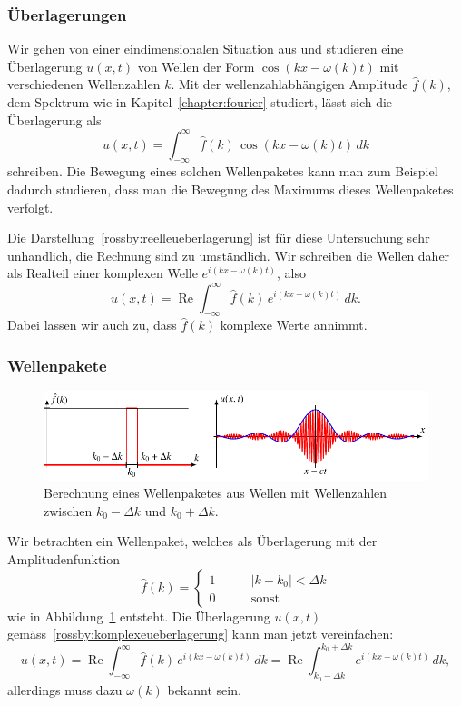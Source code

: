 \subsubsection{Überlagerungen}
Wir gehen von einer eindimensionalen Situation aus und studieren
eine Überlagerung $u(x,t)$ von Wellen der Form $\cos(kx-\omega(k) t)$
mit verschiedenen Wellenzahlen $k$.
Mit der wellenzahlabhängigen Amplitude $\hat f(k)$, dem Spektrum
wie in Kapitel~\ref{chapter:fourier} studiert, lässt sich die
Überlagerung als
\begin{equation}
u(x,t)
=
\int_{-\infty}^\infty \hat f(k)\,\cos(kx-\omega(k)t)\,dk
\label{rossby:reelleueberlagerung}
\end{equation}
schreiben.
Die Bewegung eines solchen Wellenpaketes kann man zum Beispiel
dadurch studieren, dass man die Bewegung des Maximums dieses 
Wellenpaketes verfolgt.

Die Darstellung~\eqref{rossby:reelleueberlagerung} ist für diese
Untersuchung sehr unhandlich, die Rechnung sind zu umständlich.
Wir schreiben die Wellen daher als Realteil einer komplexen
Welle $e^{i(kx-\omega(k)t)}$, also
\begin{equation}
u(x,t)
=
\operatorname{Re}
\int_{-\infty}^\infty \hat f(k)\,e^{i(kx-\omega(k)t)}\,dk.
\label{rossby:komplexeueberlagerung}
\end{equation}
Dabei lassen wir auch zu, dass $\hat{f}(k)$ komplexe Werte annimmt.

\subsubsection{Wellenpakete}
\begin{figure}
\centering
\includegraphics{chapters/7/wellenpaket.pdf}
\caption{Berechnung eines Wellenpaketes aus Wellen mit Wellenzahlen
zwischen $k_0-\Delta k$ und $k_0+\Delta k$.
\label{rossby:wellenpaket}}
\end{figure}
Wir betrachten ein Wellenpaket, welches als Überlagerung mit der
Amplitudenfunktion
\[
\hat f(k)
=
\begin{cases}
1&\qquad |k-k_0| < \Delta k\\
0&\qquad\text{sonst}
\end{cases}
\]
wie in Abbildung~\ref{rossby:wellenpaket} entsteht.
Die Überlagerung $u(x,t)$ gemäss~\eqref{rossby:komplexeueberlagerung}
kann man jetzt vereinfachen:
\[
u(x,t)
=
\operatorname{Re}
\int_{-\infty}^\infty \hat f(k)\,e^{i(kx-\omega(k)t)}\,dk
=
\operatorname{Re}
\int_{k_0-\Delta k}^{k_0+\Delta k} e^{i(kx-\omega(k)t)}\,dk,
\]
allerdings muss dazu $\omega(k)$ bekannt sein.

